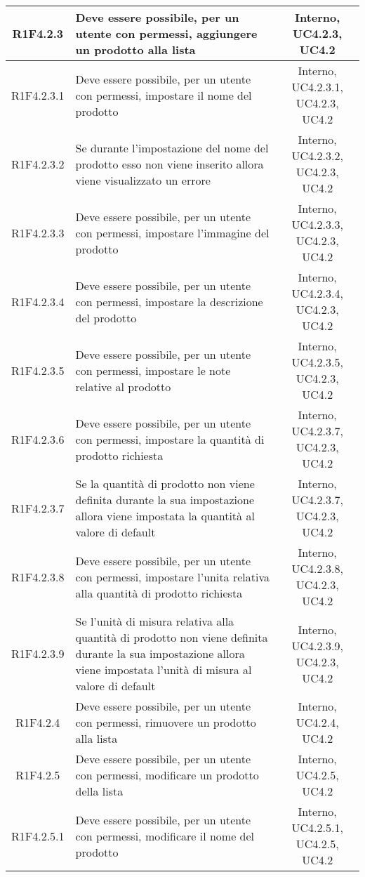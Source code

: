 \begin{longtable}{|c|>{\centering}m{7cm}|c|}
			\hline
			R1F4.2.3 & Deve essere possibile, per un utente con permessi, aggiungere un prodotto alla lista & Interno, UC4.2.3, UC4.2 \\
			\hline
			R1F4.2.3.1 & Deve essere possibile, per un utente con permessi, impostare il nome del prodotto & Interno, UC4.2.3.1, UC4.2.3, UC4.2 \\
			\hline
			R1F4.2.3.2 & Se durante l'impostazione del nome del prodotto esso non viene inserito allora viene visualizzato un errore & Interno, UC4.2.3.2, UC4.2.3, UC4.2 \\
			\hline
			R1F4.2.3.3 & Deve essere possibile, per un utente con permessi, impostare l'immagine del prodotto & Interno, UC4.2.3.3, UC4.2.3, UC4.2 \\
			\hline
			R1F4.2.3.4 & Deve essere possibile, per un utente con permessi, impostare la descrizione del prodotto & Interno, UC4.2.3.4, UC4.2.3, UC4.2 \\
			\hline
			R1F4.2.3.5 & Deve essere possibile, per un utente con permessi, impostare le note relative al prodotto & Interno, UC4.2.3.5, UC4.2.3, UC4.2 \\
			\hline
			R1F4.2.3.6 & Deve essere possibile, per un utente con permessi, impostare la quantità di prodotto richiesta & Interno, UC4.2.3.7, UC4.2.3, UC4.2 \\
			\hline
			R1F4.2.3.7 & Se la quantità di prodotto non viene definita durante la sua impostazione allora viene impostata la quantità al valore di default & Interno, UC4.2.3.7, UC4.2.3, UC4.2 \\
			\hline
			R1F4.2.3.8 & Deve essere possibile, per un utente con permessi, impostare l'unita relativa alla quantità di prodotto richiesta & Interno, UC4.2.3.8, UC4.2.3, UC4.2 \\
			\hline
			R1F4.2.3.9 & Se l'unità di misura relativa alla quantità di prodotto non viene definita durante la sua impostazione allora viene impostata l'unità di misura al valore di default & Interno, UC4.2.3.9, UC4.2.3, UC4.2 \\
			\hline
			R1F4.2.4 & Deve essere possibile, per un utente con permessi, rimuovere un prodotto alla lista & Interno, UC4.2.4, UC4.2 \\
			\hline
			R1F4.2.5 & Deve essere possibile, per un utente con permessi, modificare un prodotto della lista & Interno, UC4.2.5, UC4.2 \\
			\hline
			R1F4.2.5.1 & Deve essere possibile, per un utente con permessi, modificare il nome del prodotto & Interno, UC4.2.5.1, UC4.2.5, UC4.2 \\

\end{longtable}
